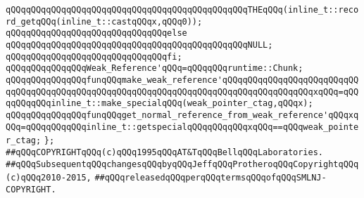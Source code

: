 \verb|qQQqqQQqqQQqqQQqqQQqqQQqqQQqqQQqqQQqqQQqqQQqqQQqTHEqQQq(inline_t::record_getqQQq(inline_t::castqQQqx,qQQq0));|\newline
\verb|qQQqqQQqqQQqqQQqqQQqqQQqqQQqqQQqelse|\newline
\verb|qQQqqQQqqQQqqQQqqQQqqQQqqQQqqQQqqQQqqQQqqQQqqQQqNULL;|\newline
\verb|qQQqqQQqqQQqqQQqqQQqqQQqqQQqqQQqfi;|\newline
\newline
\verb|qQQqqQQqqQQqqQQqWeak_Reference'qQQq=qQQqqQQqruntime::Chunk;|\newline
\newline
\verb|qQQqqQQqqQQqqQQqfunqQQqmake_weak_reference'qQQqqQQqqQQqqQQqqQQqqQQqqQQqqQQqqQQqqQQqqQQqqQQqqQQqqQQqqQQqqQQqqQQqqQQqqQQqqQQqqQQqqQQqxqQQq=qQQqqQQqqQQqinline_t::make_specialqQQq(weak_pointer_ctag,qQQqx);|\newline
\verb|qQQqqQQqqQQqqQQqfunqQQqget_normal_reference_from_weak_reference'qQQqxqQQq=qQQqqQQqqQQqinline_t::getspecialqQQqqQQqqQQqxqQQq==qQQqweak_pointer_ctag;|\newline
\verb|};|\newline
\newline
\newline
\newline
\verb|##qQQqCOPYRIGHTqQQq(c)qQQq1995qQQqAT&TqQQqBellqQQqLaboratories.|\newline
\verb|##qQQqSubsequentqQQqchangesqQQqbyqQQqJeffqQQqProtheroqQQqCopyrightqQQq(c)qQQq2010-2015,|\newline
\verb|##qQQqreleasedqQQqperqQQqtermsqQQqofqQQqSMLNJ-COPYRIGHT.|\newline

